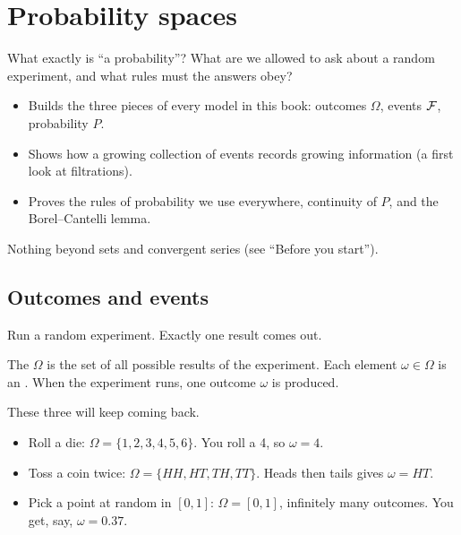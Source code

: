 \chapter{Probability spaces}
\label{ch:spaces}

\begin{question}
What exactly is ``a probability''? What are we allowed to ask about a random experiment, and what rules must the answers obey?
\end{question}

\begin{whatfor}
\begin{itemize}
  \item Builds the three pieces of every model in this book: outcomes $\Omega$, events $\mathcal F$, probability $P$.
  \item Shows how a growing collection of events records growing information (a first look at filtrations).
  \item Proves the rules of probability we use everywhere, continuity of $P$, and the Borel--Cantelli lemma.
\end{itemize}
\end{whatfor}

\begin{prereq}
Nothing beyond sets and convergent series (see ``Before you start'').
\end{prereq}

\section{Outcomes and events}

Run a random experiment. Exactly one result comes out.

\begin{definition}
The  $\Omega$ is the set of all possible results of the experiment. Each element $\omega\in\Omega$ is an . When the experiment runs, one outcome $\omega$ is produced.
\end{definition}

\begin{example}
These three will keep coming back.
\begin{itemize}
  \item Roll a die: $\Omega=\{1,2,3,4,5,6\}$. You roll a 4, so $\omega=4$.
  \item Toss a coin twice: $\Omega=\{HH,HT,TH,TT\}$. Heads then tails gives $\omega=HT$.
  \item Pick a point at random in $[0,1]$: $\Omega=[0,1]$, infinitely many outcomes. You get, say, $\omega=0.37$.
\end{itemize}
\end{example}

